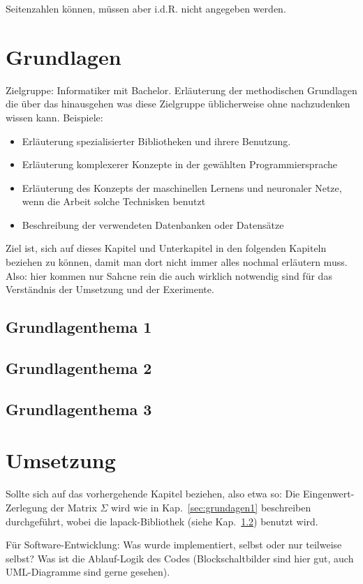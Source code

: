 \documentclass[12pt,oneside]{article}
\begin{document}
Seitenzahlen können, müssen aber i.d.R. nicht angegeben werden.

\section{Grundlagen}\label{sec:grundlagen}
Zielgruppe: Informatiker mit Bachelor. Erläuterung der methodischen Grundlagen die
über das hinausgehen was diese Zielgruppe üblicherweise ohne nachzudenken wissen kann.
Beispiele:
\begin{itemize}
\item Erläuterung spezialisierter Bibliotheken und ihrere Benutzung.
\item Erläuterung komplexerer Konzepte in der gewählten Programmiersprache
\item Erläuterung des Konzepts der maschinellen Lernens und neuronaler Netze, wenn die Arbeit solche Technisken benutzt
\item Beschreibung der verwendeten Datenbanken oder Datensätze
\end{itemize}
%
Ziel ist, sich auf dieses Kapitel und Unterkapitel in den folgenden Kapiteln beziehen zu können, damit man dort nicht immer alles nochmal erläutern muss. Also: hier kommen nur Sahcne rein die auch wirklich notwendig sind für das Verständnis der Umsetzung und der Exerimente.
\subsection{Grundlagenthema 1}\label{sec:grundlagen1}
\subsection{Grundlagenthema 2}\label{sec:grundlagen2}
\subsection{Grundlagenthema 3}\label{sec:grundlagen3}
%
\section{Umsetzung}\label{sec:umsetzung}
Sollte sich auf das vorhergehende Kapitel beziehen, also etwa so:
Die Eingenwert-Zerlegung der Matrix $\Sigma$ wird wie in Kap.~\ref{sec:grundagen1} beschreiben durchgeführt, wobei die lapack-Bibliothek (siehe Kap.~\ref{sec:grundlagen2}) benutzt wird.

Für Software-Entwicklung: Was wurde implementiert, selbst oder nur teilweise selbst? Was ist die Ablauf-Logik des Codes (Blockschaltbilder sind hier gut, auch UML-Diagramme sind gerne gesehen).
\end{document}
